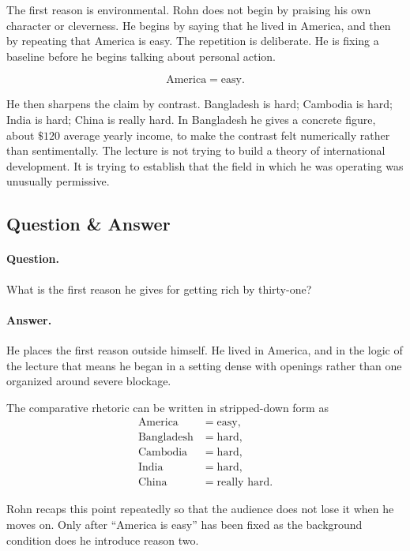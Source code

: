 The first reason is environmental. Rohn does not begin by praising his own character or cleverness. He begins by saying that he lived in America, and then by repeating that America is easy. The repetition is deliberate. He is fixing a baseline before he begins talking about personal action.

\begin{equation}
\text{America}=\text{easy}.
\end{equation}

He then sharpens the claim by contrast. Bangladesh is hard; Cambodia is hard; India is hard; China is really hard. In Bangladesh he gives a concrete figure, about \(\$120\) average yearly income, to make the contrast felt numerically rather than sentimentally. The lecture is not trying to build a theory of international development. It is trying to establish that the field in which he was operating was unusually permissive.

\subsection{Question \& Answer}

\paragraph{Question.} What is the first reason he gives for getting rich by thirty-one?

\paragraph{Answer.} He places the first reason outside himself. He lived in America, and in the logic of the lecture that means he began in a setting dense with openings rather than one organized around severe blockage.

The comparative rhetoric can be written in stripped-down form as
\begin{align}
\text{America} &= \text{easy},\\
\text{Bangladesh} &= \text{hard},\\
\text{Cambodia} &= \text{hard},\\
\text{India} &= \text{hard},\\
\text{China} &= \text{really hard}.
\end{align}

Rohn recaps this point repeatedly so that the audience does not lose it when he moves on. Only after ``America is easy'' has been fixed as the background condition does he introduce reason two.

